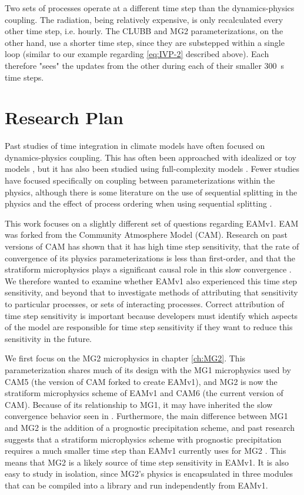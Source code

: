 \documentclass [11pt, proquest] {uwthesis}[2020/02/24]
\begin{document}
Two sets of processes operate at a different time step than the dynamics-physics coupling. The radiation, being relatively expensive, is only recalculated every other time step, i.e. hourly. The CLUBB and MG2 parameterizations, on the other hand, use a shorter time step, since they are substepped within a single loop (similar to our example regarding \eqref{eq:IVP-2} described above). Each therefore "sees" the updates from the other during each of their smaller \SI{300}{\second} time steps.

\section{Research Plan} \label{sec:approach}

Past studies of time integration in climate models have often focused on dynamics-physics coupling. This has often been approached with idealized or toy models \parencite{Staniforth2002a,Staniforth2002b,Dubal2004,Dubal2005,Dubal2006}, but it has also been studied using full-complexity models \parencite{Beljaars2004,Williamson2003,Williamson2013,Mishra2008,Mishra2011,Yu2015}. Fewer studies have focused specifically on coupling between parameterizations within the physics, although there is some literature on the use of sequential splitting in the physics and the effect of process ordering when using sequential splitting \parencite{Beljaars1991,Donahue2018}.

This work focuses on a slightly different set of questions regarding EAMv1. EAM was forked from the Community Atmosphere Model (CAM). Research on past versions of CAM has shown that it has high time step sensitivity, that the rate of convergence of its physics parameterizations is less than first-order, and that the stratiform microphysics plays a significant causal role in this slow convergence \parencite{Wan2015}. We therefore wanted to examine whether EAMv1 also experienced this time step sensitivity, and beyond that to investigate methods of attributing that sensitivity to particular processes, or sets of interacting processes. Correct attribution of time step sensitivity is important because developers must identify which aspects of the model are responsible for time step sensitivity if they want to reduce this sensitivity in the future.

We first focus on the MG2 microphysics in chapter \ref{ch:MG2}. This parameterization shares much of its design with the MG1 microphysics used by CAM5 (the version of CAM forked to create EAMv1), and MG2 is now the stratiform microphysics scheme of EAMv1 and CAM6 (the current version of CAM). Because of its relationship to MG1, it may have inherited the slow convergence behavior seen in \textcite{Wan2015}. Furthermore, the main difference between MG1 and MG2 is the addition of a prognostic precipitation scheme, and past research suggests that a stratiform microphysics scheme with prognostic precipitation requires a much smaller time step than EAMv1 currently uses for MG2 \parencite{Posselt2008,Chosson2014}. This means that MG2 is a likely source of time step sensitivity in EAMv1. It is also easy to study in isolation, since MG2's physics is encapsulated in three modules that can be compiled into a library and run independently from EAMv1.
\end{document}
